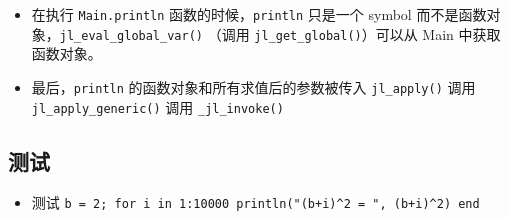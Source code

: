 \begin{itemize}
\begin{lstlisting}[language=cpp]
    // hidden fields:
    arraylist_t usings;  // modules with all bindings potentially imported
    jl_uuid_t build_id;
    jl_uuid_t uuid;
    size_t primary_world;
    _Atomic(uint32_t) counter;
    int32_t nospecialize;  // global bit flags: initialization for new methods
    int8_t optlevel;
    int8_t compile;
    int8_t infer;
    uint8_t istopmod;
    int8_t max_methods;
    jl_mutex_t lock;
    intptr_t hash;
} jl_module_t;
\end{lstlisting}
\item 在执行 \verb`Main.println` 函数的时候，\verb`println` 只是一个 symbol 而不是函数对象，\verb`jl_eval_global_var()` （调用 \verb`jl_get_global()`）可以从 Main 中获取函数对象。
\item 最后，\verb`println` 的函数对象和所有求值后的参数被传入 \verb`jl_apply()` 调用 \verb`jl_apply_generic()` 调用 \verb`_jl_invoke()`
\end{itemize}

\subsection{测试}
\begin{itemize}
\item 测试 \verb`b = 2; for i in 1:10000 println("(b+i)^2 = ", (b+i)^2) end`
\end{itemize}
